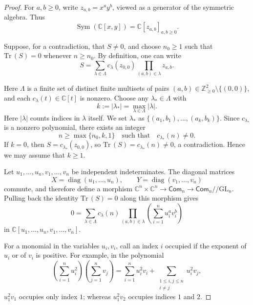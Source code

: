 \documentclass[11pt,reqno]{amsart}
\theoremstyle{definition}
\newcommand{\bbC}{\mathbb{C}}
\newcommand{\bbZ}{\mathbb{Z}}
\newcommand{\GL}{\mathrm{GL}}
\newcommand{\Tr}{\mathrm{Tr} \,}
\newcommand{\Com}{\mathsf{Com}}
\begin{document}
\begin{proof}
For \(a,b\geq0\), write \(z_{a,b}=x^ay^b\), viewed as a
generator of the symmetric algebra. Thus
\[
\operatorname{Sym}(\mathbb C[x,y])
=\mathbb C[z_{a,b}]_{a,b\geq0}.
\]




Suppose, for a contradiction, that \(S \neq 0\), and choose
\(n_0 \geq 1\) such that \(\Tr( S)=0\) whenever
\(n\geq n_0\).
By definition,
one can write
\[
S=\sum_{\lambda\in\Lambda}c_\lambda(z_{0,0})
\prod_{(a,b)\in\lambda}z_{a,b}.
\]


Here \(\Lambda\) is a finite set of distinct finite multisets of pairs
\((a,b)\in\bbZ_{\geq0}^2\setminus\{(0,0)\}\), and each
\(c_\lambda(t)\in\mathbb C[t]\) is nonzero. 
Choose any \(\lambda_*\in\Lambda\) with
\[
k:=|\lambda_*|=\max_{\lambda\in\Lambda}|\lambda|.
\]
Here \(|\lambda|\) counts indices in \(\lambda\) itself.
We set
\(\lambda_*\) as \(\{(a_1,b_1),\ldots,(a_k,b_k)\}\).
Since \(c_{\lambda_*}\) is a nonzero polynomial, there exists
an integer
\begin{equation}\label{assp n}
	n\geq\max\{n_0,k,1\}
\quad\text{such that}\quad c_{\lambda_*}(n)\neq0.
\end{equation}
If \(k=0\), then \(S=c_{\lambda_*}(z_{0,0})\), so
\(\Tr(S)=c_{\lambda_*}(n)\neq0\), a contradiction.
Hence we may assume that \(k\geq1\).

Let \(u_1,\ldots,u_n,v_1,\ldots,v_n\) be independent
indeterminates. The diagonal matrices
\[
X=\operatorname{diag}(u_1,\ldots,u_n),
\qquad
Y=\operatorname{diag}(v_1,\ldots,v_n)
\]
commute, and therefore define a morphism
\(\bbC^n \times \bbC^n \to \Com_n \to \Com_n //\GL_n\).
Pulling back the identity \(\Tr(S)=0\)
along this morphism gives
\begin{equation}\label{for: Tr S on diag}
	0=\sum_{\lambda\in\Lambda}c_\lambda(n)
\prod_{(a,b)\in\lambda}
\left(\sum_{i=1}^n u_i^av_i^b\right)
\end{equation}
in \(\mathbb C[u_1,\ldots,u_n,v_1,\ldots,v_n]\).



For a monomial in the variables \(u_i,v_i\), call an index
\(i\) occupied if the exponent of \(u_i\) or of \(v_i\)
is positive. 
For example, in the polynomial
\[
\left(\sum_{i=1}^n u_i^2\right)
\left(\sum_{j=1}^n v_j\right)
=\sum_{i=1}^n u_i^2v_i
 +\sum_{\substack{1\leq i,j\leq n\\ i\neq j}}u_i^2v_j,
\]
\(u_1^2v_1\) occupies only index \(1\); whereas \(u_1^2v_2\)
occupies indices \(1\) and \(2\).




\end{proof}
\end{document}
